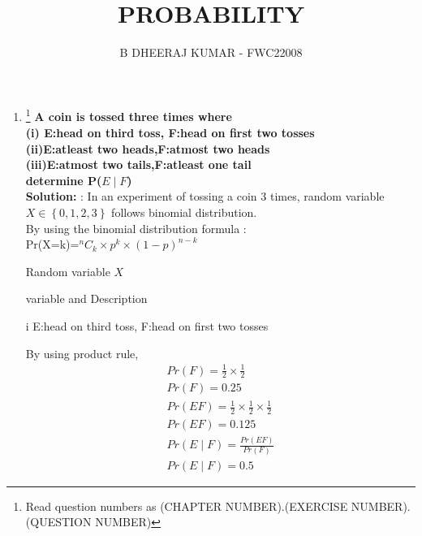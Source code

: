\documentclass{article}
\providecommand{\cbrak}[1]{\ensuremath{\left\{#1\right\}}}
\newcommand{\solution}{\noindent \textbf{Solution: }}
\begin{document}
\title{PROBABILITY}
\author{\Large B DHEERAJ KUMAR - FWC22008}
\date{}

\maketitle
\begin{enumerate}[label=13.\arabic{enumi}.\arabic{enumii}]%
\setcounter{enumi}{0}
\setcounter{enumii}{6}

\item \footnote{Read question numbers as (CHAPTER NUMBER).(EXERCISE NUMBER).(QUESTION NUMBER)}
\textbf {A coin is tossed three times where \\
(i) E:head on third toss, F:head on first two tosses\\
(ii)E:atleast two heads,F:atmost two heads\\
(iii)E:atmost two tails,F:atleast one tail\\
determine P($E \mid F$) }\\[1ex]
\solution:
In an experiment of tossing a coin 3 times, random variable $X \in \cbrak{0,1,2,3}$ follows binomial distribution.\\
By using the binomial distribution formula :\\
Pr(X=k)=$^{n}C_k \times p^k \times (1-p)^{n-k}$\\
\vspace{5mm}
\begin{table}[h]
\centering

\caption{Random variable $X$}
\label{tab:5} 
\end{table}
\begin{table}[h]
\centering
	
\caption{variable and Description}
\label{tab:2} 
\end{table}
\item[i] E:head on third toss, F:head on first two tosses

By using product rule,\\
\begin{align}
Pr(F)=\frac{1}{2}\times\frac{1}{2}\\
Pr(F)=0.25\\
Pr(EF)=\frac{1}{2}\times\frac{1}{2}\times\frac{1}{2}\\
Pr(EF)=0.125\\
Pr(E \mid F)=\frac{Pr(EF)}{Pr(F)}\\
Pr(E \mid F)=0.5
\end{align}
%


\end{enumerate}
\end{document}
